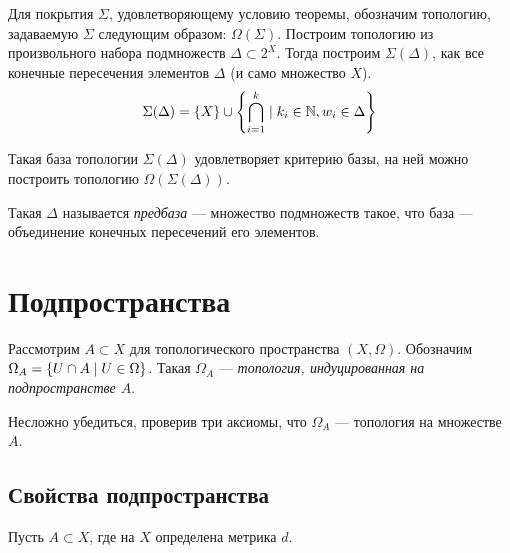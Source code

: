 \documentclass[a4paper]{report}
\begin{document}
    Для покрытия $\Sigma$, удовлетворяющему условию теоремы, обозначим топологию, задаваемую $\Sigma$ следующим образом: $\Omega(\Sigma)$.
    \ok
    Построим топологию из произвольного набора подмножеств $\Delta \subset 2^X$.
    Тогда построим $\Sigma(\Delta)$, как все конечные пересечения элементов $\Delta$ (и само множество $X$).
    \[\Sigma(\Delta) = \{X\} \cup \left\{\bigcap\limits_{i = 1}^{k}\mid k_i \in \mathbb{N}, w_i \in \Delta\right\}\]

    Такая база топологии $\Sigma(\Delta)$ удовлетворяет критерию базы, на ней можно построить топологию $\Omega(\Sigma(\Delta))$.

    Такая $\Delta$ называется \emph{предбаза} --- множество подмножеств такое, что база --- объединение конечных пересечений его элементов.


    \section{Подпространства}
    Рассмотрим $A \subset X$ для топологического пространства $(X, \Omega)$.
    Обозначим $\Omega_A = \left\{U \cap A\mid U \in \Omega\right\}$.
    Такая $\Omega_A$ --- \emph{топология, индуцированная на подпространстве $A$}.

    Несложно убедиться, проверив три аксиомы, что $\Omega_A$ --- топология на множестве $A$.

    \subsection{Свойства подпространства}
    Пусть $A \subset X$, где на $X$ определена метрика $d$.
\end{document}
